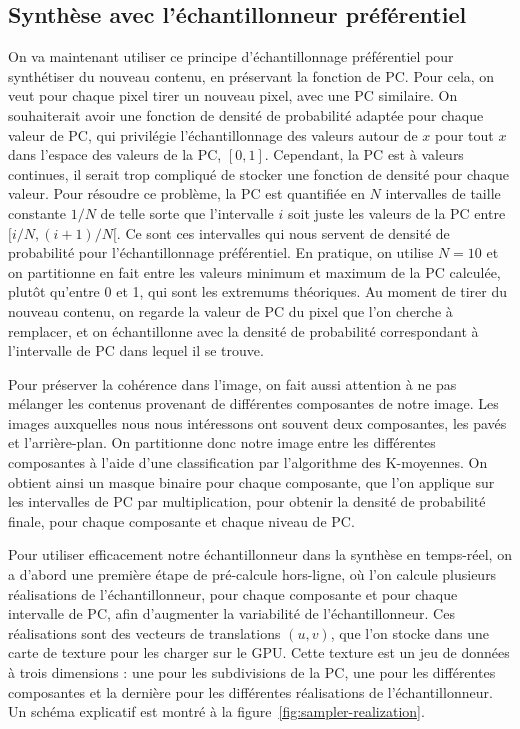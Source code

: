 \subsection{Synthèse avec l'échantillonneur préférentiel}

On va maintenant utiliser ce principe d'échantillonnage préférentiel pour synthétiser du nouveau contenu, en préservant la fonction de PC. Pour cela, on veut pour chaque pixel tirer un nouveau pixel, avec une PC similaire. On souhaiterait avoir une fonction de densité de probabilité adaptée pour chaque valeur de PC, qui privilégie l'échantillonnage des valeurs autour de $x$ pour tout $x$ dans l'espace des valeurs de la PC, $[0, 1]$. Cependant, la PC est à valeurs continues, il serait trop compliqué de stocker une fonction de densité pour chaque valeur. Pour résoudre ce problème, la PC est quantifiée en $N$ intervalles de taille constante $1/N$ de telle sorte que l'intervalle $i$ soit juste les valeurs de la PC entre $[i/N, (i+1)/N[$. Ce sont ces intervalles qui nous servent de densité de probabilité pour l'échantillonnage préférentiel. En pratique, on utilise $N=10$ et on partitionne en fait entre les valeurs minimum et maximum de la PC calculée, plutôt qu'entre 0 et 1, qui sont les extremums théoriques. Au moment de tirer du nouveau contenu, on regarde la valeur de PC du pixel que l'on cherche à remplacer, et on échantillonne avec la densité de probabilité correspondant à l'intervalle de PC dans lequel il se trouve.

\bigskip

Pour préserver la cohérence dans l'image, on fait aussi attention à ne pas mélanger les contenus provenant de différentes \og composantes \fg de notre image. Les images auxquelles nous nous intéressons ont souvent deux composantes, les pavés et l'arrière-plan. On partitionne donc notre image entre les différentes composantes à l'aide d'une classification par l'algorithme des K-moyennes. On obtient ainsi un masque binaire pour chaque composante, que l'on applique sur les intervalles de PC par multiplication, pour obtenir la densité de probabilité finale, pour chaque composante et chaque niveau de PC.

\bigskip

Pour utiliser efficacement notre échantillonneur dans la synthèse en temps-réel, on a d'abord une première étape de pré-calcule hors-ligne, où l'on calcule plusieurs réalisations de l'échantillonneur, pour chaque composante et pour chaque intervalle de PC, afin d'augmenter la variabilité de l'échantillonneur. Ces réalisations sont des vecteurs de translations $(u, v)$, que l'on stocke dans une carte de texture pour les charger sur le GPU. Cette texture est un jeu de données à trois dimensions : une pour les subdivisions de la PC, une pour les différentes composantes et la dernière pour les différentes réalisations de l'échantillonneur. Un schéma explicatif est montré à la figure~\ref{fig:sampler-realization}.

